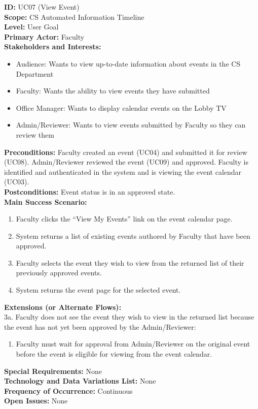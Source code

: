 \textbf{ID:} UC07 (View Event) \\
\textbf{Scope:} CS Automated Information Timeline \\
\textbf{Level:} User Goal \\
\textbf{Primary Actor:} Faculty \\
\textbf{Stakeholders and Interests:}
\begin{itemize}
    \item Audience: Wants to view up-to-date information about events in the CS Department
    \item Faculty: Wants the ability to view events they have submitted
    \item Office Manager: Wants to display calendar events on the Lobby TV
    \item Admin/Reviewer: Wants to view events submitted by Faculty so they can review them
\end{itemize}
\textbf{Preconditions:} Faculty created an event (UC04) and submitted it for review (UC08). Admin/Reviewer reviewed the event (UC09) and approved. Faculty is identified and authenticated in the system and is viewing the event calendar (UC03). \\
\textbf{Postconditions:} Event status is in an approved state. \\
\textbf{Main Success Scenario:}
\begin{enumerate}
    \item Faculty clicks the “View My Events” link on the event calendar page.
    \item System returns a list of existing events authored by Faculty that have been approved.
    \item Faculty selects the event they wish to view from the returned list of their previously approved events.
    \item System returns the event page for the selected event.
\end{enumerate}
\textbf{Extensions (or Alternate Flows):} \\
3a. Faculty does not see the event they wish to view in the returned list because the event has not yet been approved by the Admin/Reviewer:
\begin{enumerate}
    \item Faculty must wait for approval from Admin/Reviewer on the original event before the event is eligible for viewing from the event calendar.
\end{enumerate}
\textbf{Special Requirements:} None \\
\textbf{Technology and Data Variations List:} None \\
\textbf{Frequency of Occurrence:} Continuous \\
\textbf{Open Issues:} None \\

